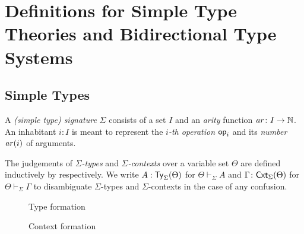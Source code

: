 \documentclass[acmsmall,screen]{acmart}
\theoremstyle{acmdefinition}
\begin{document}
\section{Definitions for Simple Type Theories and Bidirectional Type Systems}\label{sec:defs}

\subsection{Simple Types}
\begin{definition}
  A \emph{(simple type) signature} $\Sigma$ consists of a set $I$ and an \emph{arity} function $\mathit{ar}\colon I \to \mathbb{N}$.
  An inhabitant $i : I$ is meant to represent the \emph{$i$-th operation} $\mathsf{op}_i$ and its \emph{number} $ \mathit{ar}(i)$ of arguments.

  The judgements of \emph{$\Sigma$-types} and \emph{$\Sigma$-contexts} over a variable set $\Theta$ are defined inductively by  respectively.
We write $A : \mathsf{Ty}_{\Sigma}(\Theta)$ for $\Theta \vdash_{\Sigma} A$ and $\Gamma \colon \mathsf{Cxt}_{\Sigma}(\Theta)$ for $\Theta \vdash_{\Sigma} \Gamma$ to disambiguate $\Sigma$-types and $\Sigma$-contexts in the case of any confusion.
\end{definition}

\begin{figure}
  \begin{minipage}[b]{.55\textwidth}
    \centering
    \small
    \caption{Type formation}
    \label{fig:simple-type}
  \end{minipage}
  \begin{minipage}[b]{.4\textwidth}
    \centering
    \small
    \caption{Context formation}
  \label{fig:simple-context}
  \end{minipage}
\end{figure}
\end{document}
